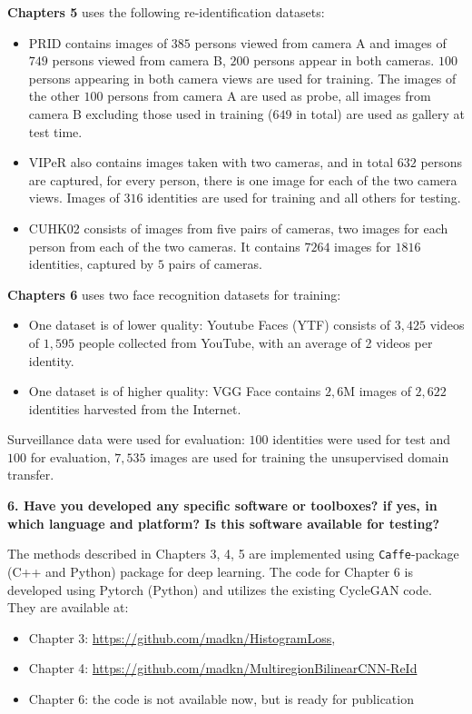 \documentclass[a4paper, 11pt, oneside]{Thesis}  %
\begin{document}
\textbf{Chapters 5} uses the following re-identification datasets:
\begin{itemize}
    \item  PRID \citep{Hirzer_h.:person} contains images of $385$ persons viewed from camera A and images of $749$ persons viewed from camera B,  $200$ persons appear in both cameras. $100$ persons appearing in both camera views are used for training. The images of the other $100$ persons from camera A are used as probe, all images from camera B excluding those used in training ($649$ in total) are used as gallery at test time. 
    
    \item VIPeR \citep{Gray07evaluatingappearance} also contains images taken with two cameras, and in total $632$ persons are captured, for every person, there is one image for each of the two camera views. Images of $316$ identities are used for training and all others for testing.
    

    \item CUHK02 \citep{li2013locally} consists of images from five pairs of cameras, two images for each person from each of the two cameras. It contains $7264$ images for $1816$ identities, captured by $5$ pairs of cameras.
\end{itemize}

\textbf{Chapters 6} uses two face recognition datasets for training:
\begin{itemize}
     \item One dataset is of lower quality: Youtube Faces (YTF) \citep{WolfHM11}   consists of $3,425$ videos of $1,595$
 people collected from YouTube, with an average of 2 videos per identity. 
     \item  One dataset is of higher quality: VGG Face \citep{parkhi2015deep} contains $2,6$M images of $2,622$ identities harvested from the Internet. 
 \end{itemize}
Surveillance data were used for evaluation: $100$ identities were used for test and $100$ for evaluation, $7,535$ images are used for training the unsupervised domain transfer.


\bigskip\ident\textbf{6. Have you developed any specific software or toolboxes?
if yes, in which language and platform? Is this software available for testing?}

The methods described in Chapters 3, 4, 5  are implemented using \texttt{Caffe}-package (C++ and Python) \citep{jia2014caffe} package for deep learning. The code for Chapter 6 is developed using Pytorch (Python) \citep{paszke2017automatic} and utilizes the existing  CycleGAN \citep{ZhuPIE17} code. 
They are available at:
\begin{itemize}
    \item Chapter 3: \url{https://github.com/madkn/HistogramLoss},
    \item Chapter 4:
    \url{https://github.com/madkn/MultiregionBilinearCNN-ReId}
    \item Chapter 6: the code is not available now, but is ready for publication
\end{itemize}
\end{document}
